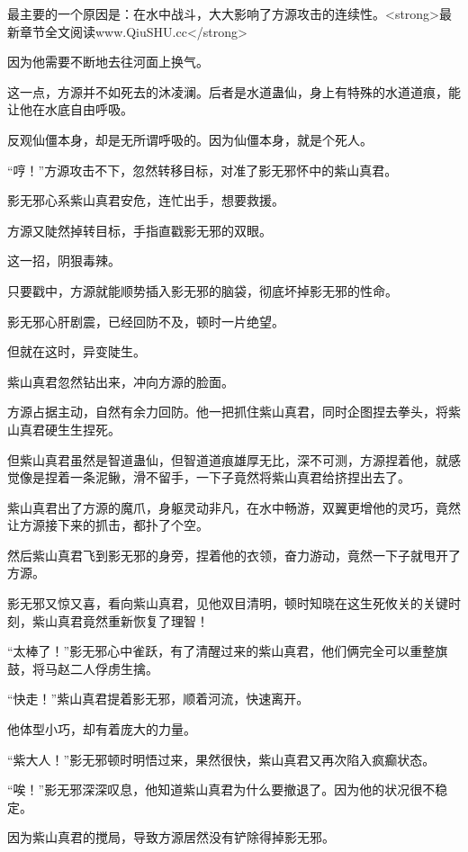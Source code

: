 
\begin{this_body}

最主要的一个原因是：在水中战斗，大大影响了方源攻击的连续性。<strong>最新章节全文阅读www.QiuSHU.cc</strong>

因为他需要不断地去往河面上换气。

这一点，方源并不如死去的沐凌澜。后者是水道蛊仙，身上有特殊的水道道痕，能让他在水底自由呼吸。

反观仙僵本身，却是无所谓呼吸的。因为仙僵本身，就是个死人。

“哼！”方源攻击不下，忽然转移目标，对准了影无邪怀中的紫山真君。

影无邪心系紫山真君安危，连忙出手，想要救援。

方源又陡然掉转目标，手指直戳影无邪的双眼。

这一招，阴狠毒辣。

只要戳中，方源就能顺势插入影无邪的脑袋，彻底坏掉影无邪的性命。

影无邪心肝剧震，已经回防不及，顿时一片绝望。

但就在这时，异变陡生。

紫山真君忽然钻出来，冲向方源的脸面。

方源占据主动，自然有余力回防。他一把抓住紫山真君，同时企图捏去拳头，将紫山真君硬生生捏死。

但紫山真君虽然是智道蛊仙，但智道道痕雄厚无比，深不可测，方源捏着他，就感觉像是捏着一条泥鳅，滑不留手，一下子竟然将紫山真君给挤捏出去了。

紫山真君出了方源的魔爪，身躯灵动非凡，在水中畅游，双翼更增他的灵巧，竟然让方源接下来的抓击，都扑了个空。

然后紫山真君飞到影无邪的身旁，捏着他的衣领，奋力游动，竟然一下子就甩开了方源。

影无邪又惊又喜，看向紫山真君，见他双目清明，顿时知晓在这生死攸关的关键时刻，紫山真君竟然重新恢复了理智！

“太棒了！”影无邪心中雀跃，有了清醒过来的紫山真君，他们俩完全可以重整旗鼓，将马赵二人俘虏生擒。

“快走！”紫山真君提着影无邪，顺着河流，快速离开。

他体型小巧，却有着庞大的力量。

“紫大人！”影无邪顿时明悟过来，果然很快，紫山真君又再次陷入疯癫状态。

“唉！”影无邪深深叹息，他知道紫山真君为什么要撤退了。因为他的状况很不稳定。

因为紫山真君的搅局，导致方源居然没有铲除得掉影无邪。


\end{this_body}
